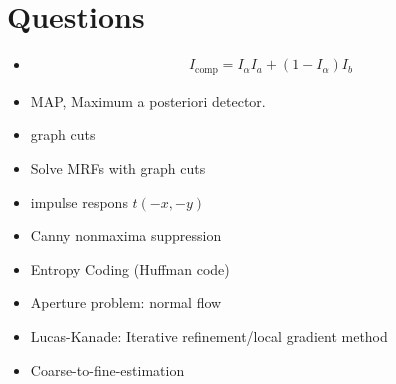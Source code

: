 \newpage
\chapter{Questions}
\begin{itemize}[leftmargin=2em]
	\item 
	\begin{gather*}
		I_{\text{comp}}=I_{\alpha}I_{a}+\left( 1-I_{\alpha} \right)I_b
	\end{gather*}
	\item MAP, Maximum a posteriori detector.
	\item graph cuts
	\item Solve MRFs with graph cuts
	\item impulse respons $t(-x,-y)$
	\item Canny nonmaxima suppression
	\item Entropy Coding (Huffman code)
	\item Aperture problem: normal flow
	\item Lucas-Kanade: Iterative refinement/local gradient method
	\item Coarse-to-fine-estimation
\end{itemize}
\vfill
